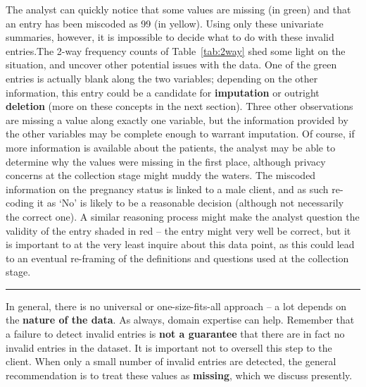 The analyst can quickly notice that some values are missing (in green) and that an entry has been miscoded as 99 (in yellow). Using only these univariate summaries, however, it is impossible to decide what to do with these invalid entries.\newl The 2-way frequency counts of Table~\ref{tab:2way} shed some light on the situation, and uncover other potential issues with the data. One of the green entries is actually blank along the two variables; depending on the other information, this entry could be a candidate for \textbf{imputation} or outright \textbf{deletion} (more on these concepts in the next section). Three other observations are missing a value along exactly one variable, but the information provided by the other variables may be complete enough to warrant imputation. Of course, if more information is available about the patients, the analyst may be able to determine why the values were missing in the first place, although privacy concerns at the collection stage might muddy the waters. The miscoded information on the pregnancy status is linked to a male client, and as such re-coding it as `No' is likely to be a reasonable decision (although not necessarily the correct one). A similar reasoning process might make the analyst question the validity of the entry shaded in red -- the entry might very well be correct, but it is important to at the very least inquire about this data point, as this could lead to an eventual re-framing of the definitions and questions used at the collection stage.   
\begin{center}
    \rule{0.5\textwidth}{.4pt}
\end{center}
In general, there is no universal or one-size-fits-all approach -- a lot depends on the \textbf{nature of the data}. As always, domain expertise can help. Remember that a failure to detect invalid entries is \textbf{not a guarantee} that there are in fact no invalid entries in the dataset. It is important not to oversell this step to the client. When only a small number of invalid entries are detected, the general recommendation is to treat these values as  \textbf{missing}, which we discuss presently.
